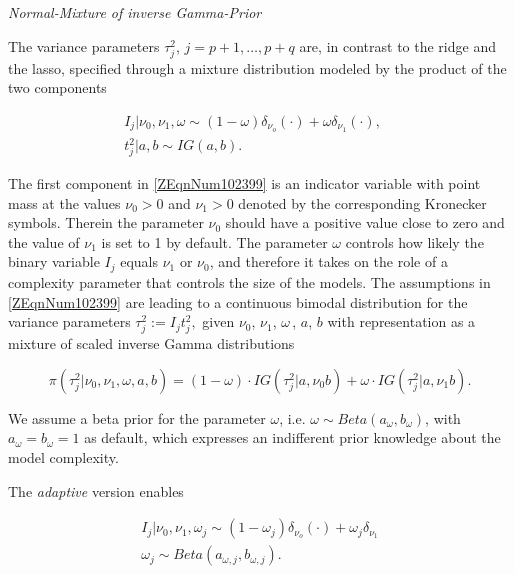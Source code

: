 \documentclass[11pt,a4paper,twoside]{bayesxarticle}
\begin{document}
{\em Normal-Mixture of inverse Gamma-Prior}

The variance parameters $\tau _{j}^{2} $, $j=p+1,\ldots,p+q$ are, in contrast to the ridge and the lasso, specified through a
mixture distribution modeled by the product of the two components

\begin{equation}
\label{ZEqnNum102399}
\begin{array}{l} {I_{j} |\nu _{0} ,\nu _{1} ,\omega \sim \left(1-\omega \right)
\delta _{\nu _{o} } \left(\cdot \right)+\omega \delta _{\nu _{1} } \left(\cdot \right),
\quad } \\ {t_{j}^{2} |a,b \sim IG\left(a,b\right).} \end{array}
\end{equation}

The first component in \eqref{ZEqnNum102399} is an indicator variable with point
mass at the values $\nu _{0} >0$ and $\nu _{1} >0$ denoted by the corresponding Kronecker
symbols. Therein the parameter $\nu _{0} $ should have a positive value close to
zero and the value of $\nu _{1} $ is set to 1 by default. The parameter $\omega $ controls how
likely the binary variable $I_{j} $ equals $\nu _{1} $ or $\nu _{0} $, and therefore
it takes on the role of a complexity parameter that controls the size of the models.
The assumptions in \eqref{ZEqnNum102399} are leading to a continuous bimodal distribution
for the variance parameters $\tau _{j}^{2} :=I_{j} t_{j}^{2} ,$ given $\nu _{0} $, $\nu
_{1} $, $\omega \, $, $a $, $b $ with representation as a mixture
of scaled inverse Gamma distributions

\[
\pi \left(\tau _{j}^{2} |\nu _{0} ,\nu _{1} ,\omega ,a ,b \right)=
\left(1-\omega \right)\cdot IG\left(\tau _{j}^{2} |a ,\nu _{0} b
\right)+\omega \cdot IG\left(\tau _{j}^{2} | a ,\nu _{1} b \right).
\]

We assume a beta prior for the parameter $\omega $, i.e. $\omega \sim  Beta \left( a_{\omega} ,b_{\omega} \right)$,
with $ {{a_\omega }={b_\omega }} = 1$ as default, which expresses an indifferent prior knowledge about the model complexity.

The {\em adaptive} version enables

\[\begin{array}{l}
 I_j|\nu _{0} ,\nu _{1} ,\omega_j \sim \left(1-\omega_j \right) \delta _{\nu _{o} } \left(\cdot \right)+\omega_j \delta _{\nu _{1} } \\
 {\omega _j}\sim Beta\left( {{a_{\omega ,j}},{b_{\omega ,j}}} \right) .\\
 \end{array}\]
\end{document}
